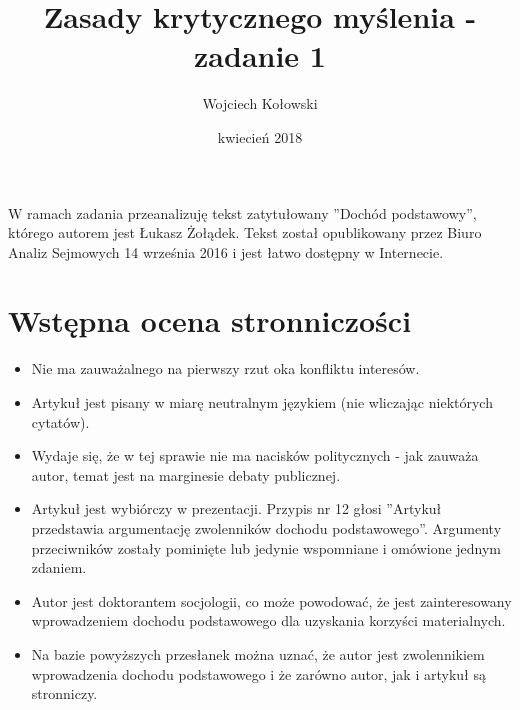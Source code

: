 \documentclass[11pt]{article}
\title{Zasady krytycznego myślenia - zadanie 1}
\author{Wojciech Kołowski}
\date{kwiecień 2018}
\begin{document}
	\maketitle
	
	\par W ramach zadania przeanalizuję tekst zatytułowany ''Dochód podstawowy'', którego autorem jest Łukasz Żołądek. Tekst został opublikowany przez Biuro Analiz Sejmowych 14 września 2016 i jest łatwo dostępny w Internecie.
	
	\section{Wstępna ocena stronniczości}
	\begin{itemize}
		\item Nie ma zauważalnego na pierwszy rzut oka konfliktu interesów.
		\item Artykuł jest pisany w miarę neutralnym językiem (nie wliczając niektórych cytatów).
		\item Wydaje się, że w tej sprawie nie ma nacisków politycznych - jak zauważa autor, temat jest na marginesie debaty publicznej.
		\item Artykuł jest wybiórczy w prezentacji. Przypis nr 12 głosi ''Artykuł przedstawia argumentację zwolenników dochodu podstawowego''. Argumenty przeciwników zostały pominięte lub jedynie wspomniane i omówione jednym zdaniem.
		\item Autor jest doktorantem socjologii, co może powodować, że jest zainteresowany wprowadzeniem dochodu podstawowego dla uzyskania korzyści materialnych.
		\item Na bazie powyższych przesłanek można uznać, że autor jest zwolennikiem wprowadzenia dochodu podstawowego i że zarówno autor, jak i artykuł są stronniczy.
	\end{itemize}
	
\end{document}
